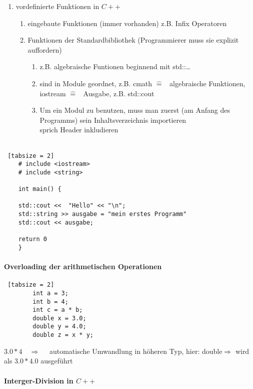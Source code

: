 \documentclass{article}
\begin{document}
\begin{enumerate}
		\item vordefinierte Funktionen in $C++$
		\begin{enumerate}
			\item eingebaute Funktionen (immer vorhanden) z.B. Infix Operatoren
			\item Funktionen der Standardbibliothek (Programmierer muss sie explizit auffordern)
			\begin{enumerate}
				\item z.B. algebraische Funtionen beginnend mit std::\dots
				\item sind in Module geordnet, z.B. cmath $\widehat{=}$ \, algebraische Funktionen, iostream $\widehat{=}$ \, Ausgabe, z.B. std::cout
				\item Um ein Modul zu benutzen, muss man zuerst (am Anfang des Programms) sein Inhaltsverzeichnis importieren \\
				 sprich \grqq Header inkludieren\grqq \\
				 \\
			\end{enumerate}
		\end{enumerate}
	\end{enumerate}
	
	\begin{lstlisting} [tabsize = 2]
	# include <iostream> 
	# include <string> 
	
	int main() {
	
	std::cout <<  "Hello" << "\n";
	std::string >> ausgabe = "mein erstes Programm"
	std::cout << ausgabe;
	
	return 0
	}
	\end{lstlisting}
	
	\paragraph{Overloading der arithmetischen Operationen}
	
	\begin{lstlisting} [tabsize = 2]
		int a = 3;
		int b = 4;
		int c = a * b;
		double x = 3.0;
		double y = 4.0;
		double z = x * y;
	\end{lstlisting}
	$3.0 * 4 \quad \Rightarrow \quad$ automatische Umwandlung in höheren Typ, hier: \grqq double\grqq $\Rightarrow$ wird als $3.0 * 4.0$ ausgeführt \\
	
	\paragraph{Interger-Division in $C++$}
	
\end{document}
